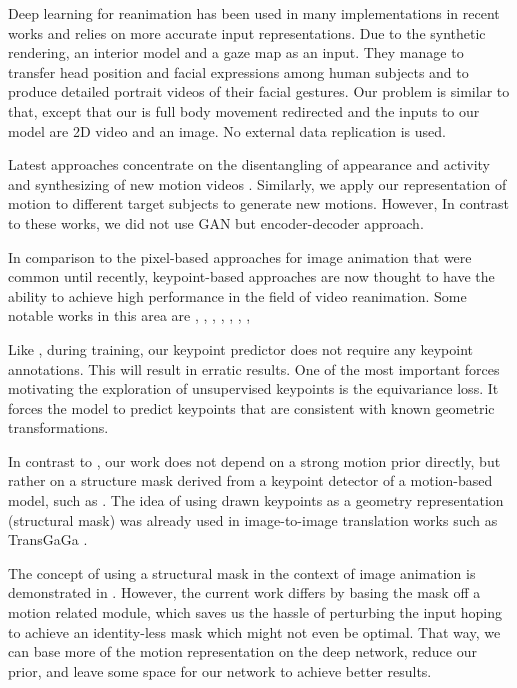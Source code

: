 \documentclass{article}
\begin{document}
Deep learning for reanimation has been used in many implementations in
recent works and relies on more accurate input representations. Due to the
synthetic rendering, an interior model and a gaze map as an input. They
manage to transfer head position and facial expressions among human subjects
and to produce detailed portrait videos of their facial
gestures\cite{kim2018deep}. Our problem is similar to that, except that our
is full body movement  redirected and the inputs to our model are 2D video
and an image. No external data replication is used.

Latest approaches concentrate on the disentangling of appearance and
activity and synthesizing of new motion videos \cite{tulyakov2018mocogan}.
Similarly, we apply our representation of motion to different target 
subjects to generate new motions. However, In contrast to these works, we did not use GAN but encoder-decoder approach.

In comparison to the pixel-based approaches for image animation that were common until recently,
keypoint-based approaches are now thought to have the ability to achieve
high performance in the field of video reanimation. Some notable works in
this area are \cite{siarohin2020order}, \cite{wiles2018x2face},
\cite{siarohin2019animating}, \cite{kim2019unsupervised},
\cite{balakrishnan2018synthesizing}, \cite{ma2017pose},
\cite{reed2017parallel}, \cite{chan2019everybody}

Like \cite{siarohin2020order}, during training, our keypoint predictor does not require any keypoint annotations. This will result in erratic results. One of the most important forces motivating the exploration of unsupervised keypoints is the equivariance loss. It forces the model to predict keypoints that are consistent with known geometric transformations.

In contrast to \cite{siarohin2020order}, our work does not depend on a strong
motion prior directly, but rather on a
structure mask derived from a keypoint detector of a motion-based model,
such as \cite{siarohin2020order}. The idea of using drawn keypoints as a
geometry representation (structural mask) was already used in image-to-image
translation works such as TransGaGa \cite{wu2019transgaga}.

The concept of using a structural mask in the context of image animation is
demonstrated in \cite{shalev2020image}. However, the current work differs
by basing the mask off a motion related module, which saves us the hassle
of perturbing the input hoping to achieve an identity-less mask which might
not even be optimal. That way, we
can base more of the motion representation on the deep network, reduce our
prior, and leave some space for our network to achieve better results.
\end{document}
